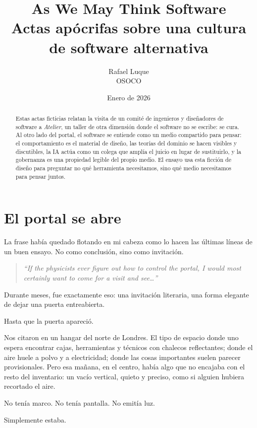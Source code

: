 \documentclass[11pt,a4paper]{article}
\title{As We May Think Software\\[0.5em]
  {\large Actas apócrifas sobre una cultura de software alternativa}}
\author{Rafael Luque\\ {\normalsize OSOCO}}
\date{Enero de 2026}
\begin{document}
\maketitle

\begin{abstract}
Estas actas ficticias relatan la visita de un comité de ingenieros y
diseñadores de software a \emph{Atelier}, un taller de otra dimensión donde el
software no se escribe: se cura. Al otro lado del portal, el software se
entiende como un medio compartido para pensar: el comportamiento es el
material de diseño, las teorías del dominio se hacen visibles y discutibles,
la IA actúa como un colega que amplía el juicio en lugar de sustituirlo, y la
gobernanza es una propiedad legible del propio medio. El ensayo usa esta
ficción de diseño para preguntar no qué herramienta necesitamos, sino qué
medio necesitamos para pensar juntos.
\end{abstract}

\tableofcontents
\newpage

\section{El portal se abre}

La frase había quedado flotando en mi cabeza como lo hacen las últimas líneas
de un buen ensayo. No como conclusión, sino como invitación.

\begin{quote}\itshape
``If the physicists ever figure out how to control the portal, I would most
certainly want to come for a visit and see\ldots''~\cite{petricek}
\end{quote}

Durante meses, fue exactamente eso: una invitación literaria, una forma
elegante de dejar una puerta entreabierta.

Hasta que la puerta apareció.

Nos citaron en un hangar del norte de Londres. El tipo de espacio donde uno
espera encontrar cajas, herramientas y técnicos con chalecos reflectantes;
donde el aire huele a polvo y a electricidad; donde las cosas importantes
suelen parecer provisionales. Pero esa mañana, en el centro, había algo que no
encajaba con el resto del inventario: un vacío vertical, quieto y preciso,
como si alguien hubiera recortado el aire.

No tenía marco. No tenía pantalla. No emitía luz.

Simplemente estaba.
\end{document}

